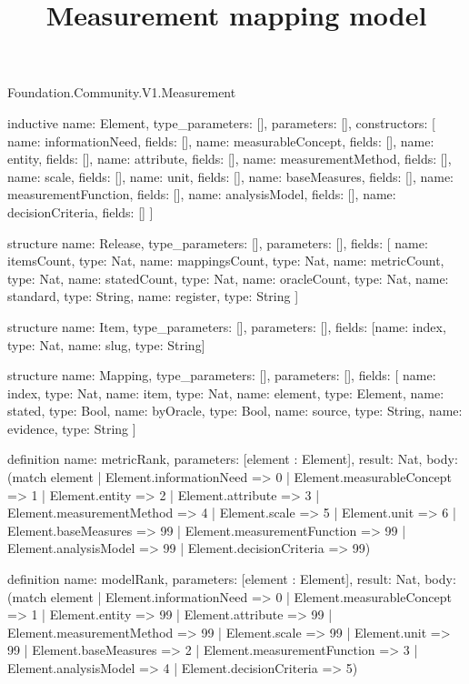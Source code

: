 \begin{lexlean}{Foundation.Community.V1.Measurement}
\title{Measurement mapping model}
\begin{semanticmodule}
inductive{
  name: Element,
  type_parameters: [],
  parameters: [],
  constructors: [
    {name: informationNeed, fields: []},
    {name: measurableConcept, fields: []},
    {name: entity, fields: []},
    {name: attribute, fields: []},
    {name: measurementMethod, fields: []},
    {name: scale, fields: []},
    {name: unit, fields: []},
    {name: baseMeasures, fields: []},
    {name: measurementFunction, fields: []},
    {name: analysisModel, fields: []},
    {name: decisionCriteria, fields: []}
  ]
}

structure{
  name: Release,
  type_parameters: [],
  parameters: [],
  fields: [
    {name: itemsCount, type: Nat},
    {name: mappingsCount, type: Nat},
    {name: metricCount, type: Nat},
    {name: statedCount, type: Nat},
    {name: oracleCount, type: Nat},
    {name: standard, type: String},
    {name: register, type: String}
  ]
}

structure{
  name: Item,
  type_parameters: [],
  parameters: [],
  fields: [{name: index, type: Nat}, {name: slug, type: String}]
}

structure{
  name: Mapping,
  type_parameters: [],
  parameters: [],
  fields: [
    {name: index, type: Nat},
    {name: item, type: Nat},
    {name: element, type: Element},
    {name: stated, type: Bool},
    {name: byOracle, type: Bool},
    {name: source, type: String},
    {name: evidence, type: String}
  ]
}

definition{
  name: metricRank,
  parameters: [element : Element],
  result: Nat,
  body: (match element
    | Element.informationNeed => 0
    | Element.measurableConcept => 1
    | Element.entity => 2
    | Element.attribute => 3
    | Element.measurementMethod => 4
    | Element.scale => 5
    | Element.unit => 6
    | Element.baseMeasures => 99
    | Element.measurementFunction => 99
    | Element.analysisModel => 99
    | Element.decisionCriteria => 99)
}

definition{
  name: modelRank,
  parameters: [element : Element],
  result: Nat,
  body: (match element
    | Element.informationNeed => 0
    | Element.measurableConcept => 1
    | Element.entity => 99
    | Element.attribute => 99
    | Element.measurementMethod => 99
    | Element.scale => 99
    | Element.unit => 99
    | Element.baseMeasures => 2
    | Element.measurementFunction => 3
    | Element.analysisModel => 4
    | Element.decisionCriteria => 5)
}


\end{semanticmodule}
\end{lexlean}
